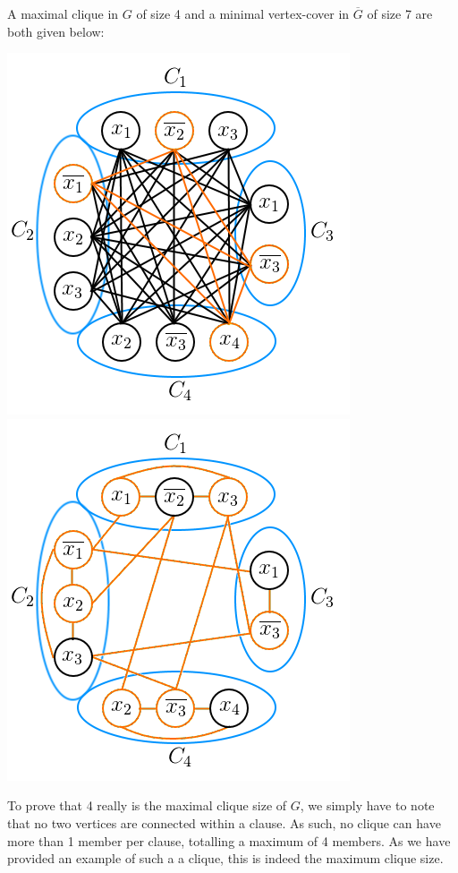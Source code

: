 \documentclass{article}
\begin{document}
A maximal clique in $G$ of size 4 and a minimal vertex-cover in $\overline{G}$ of size 7 are both given below:
\begin{center}
  \includegraphics[scale=.6]{clique2.png}
  \includegraphics[scale=.6]{cover2.png}
\end{center}

To prove that 4 really is the maximal clique size of $G$, we simply have to note that no two vertices are connected within a clause. As such, no clique can have more than 1 member per clause, totalling a maximum of 4 members. As we have provided an example of such a a clique, this is indeed the maximum clique size.
\end{document}
